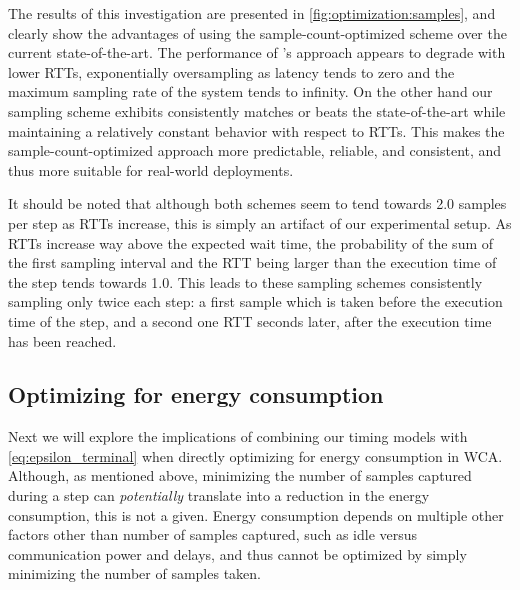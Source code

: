 The results of this investigation are presented in \cref{fig:optimization:samples}, and clearly show the advantages of using the sample-count-optimized scheme over the current state-of-the-art.
The performance of \textcite{Wang2019Towards}'s approach appears to degrade with lower \acp{RTT}, exponentially oversampling as latency tends to zero and the maximum sampling rate of the system tends to infinity.
On the other hand our sampling scheme exhibits consistently matches or beats the state-of-the-art while maintaining a relatively constant behavior with respect to \acp{RTT}.
This makes the sample-count-optimized approach more predictable, reliable, and consistent, and thus more suitable for real-world deployments.

It should be noted that although both schemes seem to tend towards \num{2.0} samples per step as \acp{RTT} increase, this is simply an artifact of our experimental setup.
As \acp{RTT} increase way above the expected wait time, the probability of the sum of the first sampling interval and the \ac{RTT} being larger than the execution time of the step tends towards \num{1.0}.
This leads to these sampling schemes consistently sampling only twice each step: a first sample which is taken before the execution time of the step, and a second one \ac{RTT} seconds later, after the execution time has been reached. 

\subsection{Optimizing for energy consumption}\label{ssec:optimization:energy}

Next we will explore the implications of combining our timing models with \cref{eq:epsilon_terminal} when directly optimizing for energy consumption in \ac{WCA}.
Although, as mentioned above, minimizing the number of samples captured during a step can \emph{potentially} translate into a reduction in the energy consumption, this is not a given.
Energy consumption depends on multiple other factors other than number of samples captured, such as idle versus communication power and delays, and thus cannot be optimized by simply minimizing the number of samples taken.

